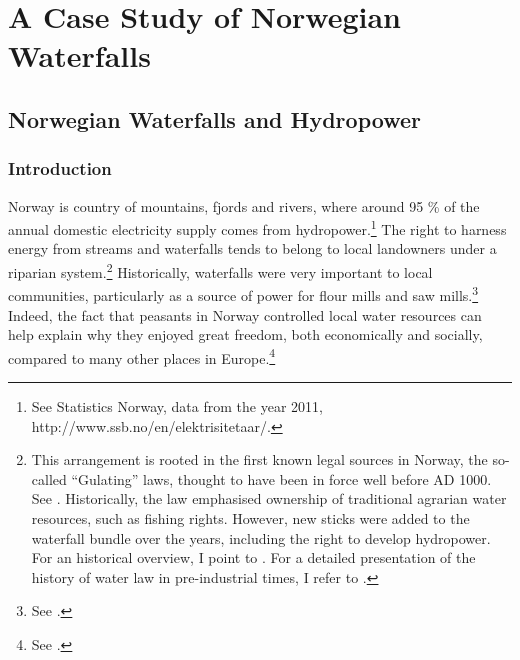 \part{A Case Study of Norwegian Waterfalls}

\chapter{Norwegian Waterfalls and Hydropower}\label{chap:3}

\section{Introduction}\label{sec:into3}

Norway is country of mountains, fjords and rivers, where around 95 \% of the annual domestic electricity supply comes from hydropower.\footnote{See Statistics Norway, data from the year 2011, http://www.ssb.no/en/elektrisitetaar/.} The right to harness energy from streams and waterfalls tends to belong to local landowners under a riparian system.\footnote{This arrangement is rooted in the first known legal sources in Norway, the so-called ``Gulating'' laws, thought to have been in force well before AD 1000. See \cite[111-112,120]{robberstad81}. Historically, the law emphasised ownership of traditional agrarian water resources, such as fishing rights. However, new sticks were added to the waterfall bundle over the years, including the right to develop hydropower. For an historical overview, I point to \cite[14-32]{vislie44}. For a detailed presentation of the history of water law in pre-industrial times, I refer to \cite{motzfeld08}. } Historically, waterfalls were very important to local communities, particularly as a source of power for flour mills and saw mills.\footnote{See \cite[121]{tvedt13}.} Indeed, the fact that peasants in Norway controlled local water resources can help explain why they enjoyed great freedom, both economically and socially, compared to many other places in Europe.\footnote{See \cite[121]{tvedt13}.}


